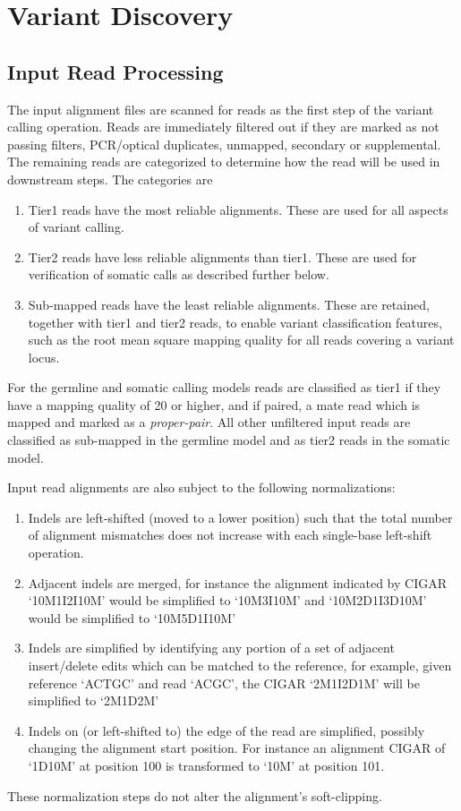 \documentclass{article}
\begin{document}
\section{Variant Discovery}

\subsection{Input Read Processing}

The input alignment files are scanned for reads as the first step of the variant calling operation. Reads are immediately filtered out if they are marked as not passing filters, PCR/optical duplicates, unmapped, secondary or supplemental. The remaining reads are categorized to determine how the read will be used in downstream steps. The categories are
\begin{enumerate}
    \item Tier1 reads have the most reliable alignments. These are used for all aspects of variant calling.
    \item Tier2 reads have less reliable alignments than tier1. These are used for verification of somatic calls as described further below.
    \item Sub-mapped reads have the least reliable alignments. These are retained, together with tier1 and tier2 reads, to enable  variant classification features, such as the root mean square mapping quality for all reads covering a variant locus.
\end{enumerate}

For the germline and somatic calling models reads are classified as tier1 if they have a mapping quality of 20 or higher, and if paired, a mate read which is mapped and marked as a \emph{proper-pair}. All other unfiltered input reads are classified as sub-mapped in the germline model and as tier2 reads in the somatic model.

Input read alignments are also subject to the following normalizations:
\begin{enumerate}
    \item Indels are left-shifted (moved to a lower position) such that the total number of alignment mismatches does not increase with each single-base left-shift operation.
    \item Adjacent indels are merged, for instance the alignment indicated by CIGAR `10M1I2I10M' would be simplified to `10M3I10M' and `10M2D1I3D10M' would be simplified to `10M5D1I10M'
    \item Indels are simplified by identifying any portion of a set of adjacent insert/delete edits which can be matched to the reference, for example, given reference `ACTGC' and read `ACGC', the CIGAR `2M1I2D1M' will be simplified to `2M1D2M'
    \item Indels on (or left-shifted to) the edge of the read are simplified, possibly changing the alignment start position. For instance an alignment CIGAR of `1D10M' at position 100 is transformed to `10M' at position 101.
\end{enumerate}
These normalization steps do not alter the alignment's soft-clipping.
\end{document}
